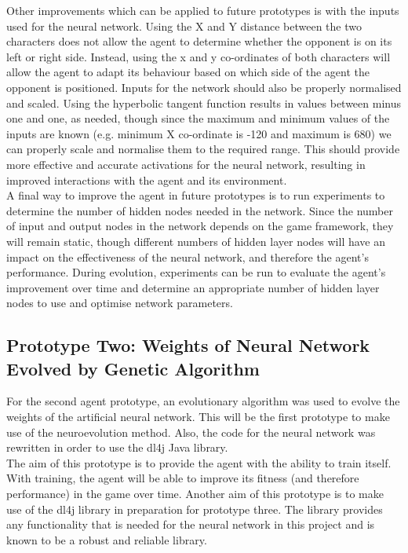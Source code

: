 \documentclass[12pt,a4paper]{article}
\begin{document}
Other improvements which can be applied to future prototypes is with the inputs used for the neural network. Using the X and Y distance between the two characters does not allow the agent to determine whether the opponent is on its left or right side. Instead, using the x and y co-ordinates of both characters will allow the agent to adapt its behaviour based on which side of the agent the opponent is positioned. Inputs for the network should also be properly normalised and scaled. Using the hyperbolic tangent function results in values between minus one and one, as needed, though since the maximum  and minimum values of the inputs are known (e.g. minimum X co-ordinate is -120 and maximum is 680) we can properly scale and normalise them to the required range. This should provide more effective and accurate activations for the neural network, resulting in improved interactions with the agent and its environment.\\
 
A final way to improve the agent in future prototypes is to run experiments to determine the number of hidden nodes needed in the network. Since the number of input and output nodes in the network depends on the game framework, they will remain static, though different numbers of hidden layer nodes will have an impact on the effectiveness of the neural network, and therefore the agent's performance. During evolution, experiments can be run to evaluate the agent's improvement over time and determine an appropriate number of hidden layer nodes to use and optimise network parameters.
\newpage
\subsection{Prototype Two: Weights of Neural Network Evolved by Genetic Algorithm}
For the second agent prototype, an evolutionary algorithm was used to evolve the weights of the artificial neural network. This will be the first prototype to make use of the neuroevolution method. Also, the code for the neural network was rewritten in order to use the dl4j Java library.\\

The aim of this prototype is to provide the agent with the ability to train itself. With training, the agent will be able to improve its fitness (and therefore performance) in the game over time. Another aim of this prototype is to make use of the dl4j library in preparation for prototype three. The library provides any functionality that is needed for the neural network in this project and is known to be a robust and reliable library.
\end{document}
